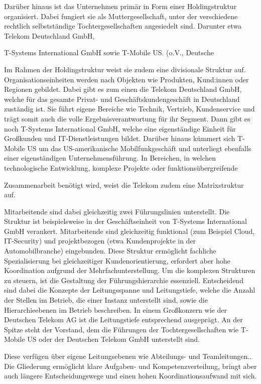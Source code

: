 \documentclass[12pt,a4paper]{article}
\newcommand{\zitat}[1]{\parencite{#1}}
\begin{document}
	\noindent Darüber hinaus ist das Unternehmen primär in Form einer Holdingstruktur
	organisiert. Dabei fungiert sie als Muttergesellschaft, unter der
	verschiedene rechtlich selbstständige Tochtergesellschaften angesiedelt
	sind. Darunter etwa Telekom Deutschland GmbH,
	
	\noindent T-Systems International GmbH sowie T-Mobile US. (o.V., Deutsche
	
	\noindent \zitat{telekom2024} Im Rahmen der Holdingstruktur weist sie
	zudem eine divisionale Struktur auf. Organisationseinheiten werden nach
	Objekten wie Produkten, Kund:innen oder Regionen gebildet. Dabei gibt es
	zum einen die Telekom Deutschland GmbH, welche für das gesamte Privat-
	und Geschäftskundengeschäft in Deutschland zuständig ist. Sie führt
	eigene Bereiche wie Technik, Vertrieb, Kundenservice und trägt somit
	auch die volle Ergebnisverantwortung für ihr Segment. Dann gibt es noch
	T-Systems International GmbH, welche eine eigenständige Einheit für
	Großkunden und IT-Dienstleistungen bildet. Darüber hinaus kümmert sich
	T-Mobile US um das US-amerikanische Mobilfunkgeschäft und unterliegt
	ebenfalls einer eigenständigen Unternehmensführung.\zitat{telekom2025basis} In Bereichen, in welchen
	technologische Entwicklung, komplexe Projekte oder
	funktionsübergreifende
	
	\noindent Zusammenarbeit benötigt wird, weist die Telekom zudem eine
	Matrixstruktur auf.
	
	\noindent Mitarbeitende sind dabei gleichzeitig zwei Führungslinien unterstellt.
	Die Struktur ist beispielsweise in der Geschäftseinheit von T-Systems
	International GmbH verankert. Mitarbeitende sind gleichzeitig funktional
	(zum Beispiel Cloud, IT-Security) und projektbezogen (etwa
	Kundenprojekte in der Automobilbranche) eingebunden. Diese Struktur
	ermöglicht fachliche Spezialisierung bei gleichzeitiger
	Kundenorientierung, erfordert aber hohe Koordination aufgrund der
	Mehrfachunterstellung. Um die komplexen Strukturen zu steuern, ist die
	Gestaltung der Führungshierarchie essenziell. Entscheidend sind dabei
	die Konzepte der Leitungsspanne und Leitungstiefe, welche die Anzahl der
	Stellen im Betrieb, die einer Instanz unterstellt sind, sowie die
	Hierarchieebenen im Betrieb beschreiben. In einem Großkonzern wie der
	Deutschen Telekom AG ist die Leitungstiefe entsprechend ausgeprägt. An
	der Spitze steht der Vorstand, dem die Führungen der
	Tochtergesellschaften wie T-Mobile US oder der Deutschen Telekom GmbH
	unterstellt sind.
	
	\noindent Diese verfügen über eigene Leitungsebenen wie Abteilungs- und
	Teamleitungen.\zitat{telekom2024}. Die Gliederung ermöglicht
	klare Aufgaben- und Kompetenzverteilung, bringt aber auch längere
	Entscheidungswege und einen hohen Koordinationsaufwand mit sich.
	
\end{document}
